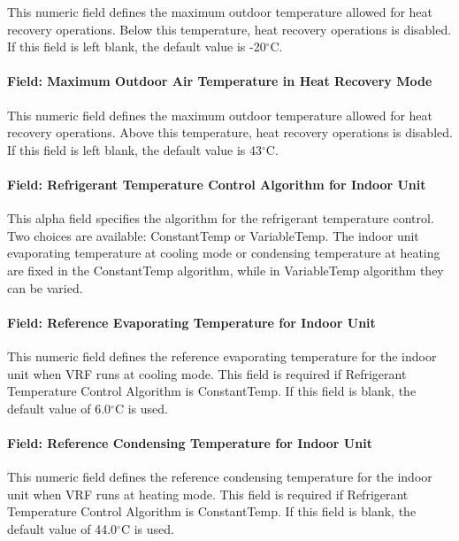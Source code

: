 This numeric field defines the maximum outdoor temperature allowed for heat recovery operations. Below this temperature, heat recovery operations is disabled. If this field is left blank, the default value is -20$^\circ$C.

\paragraph{Field: Maximum Outdoor Air Temperature in Heat Recovery Mode}

This numeric field defines the maximum outdoor temperature allowed for heat recovery operations. Above this temperature, heat recovery operations is disabled. If this field is left blank, the default value is 43$^\circ$C.

\paragraph{Field: Refrigerant Temperature Control Algorithm for Indoor Unit}

This alpha field specifies the algorithm for the refrigerant temperature control. Two choices are available: ConstantTemp or VariableTemp. The indoor unit evaporating temperature at cooling mode or condensing temperature at heating are fixed in the ConstantTemp algorithm, while in VariableTemp algorithm they can be varied.

\paragraph{Field: Reference Evaporating Temperature for Indoor Unit}

This numeric field defines the reference evaporating temperature for the indoor unit when VRF runs at cooling mode. This field is required if Refrigerant Temperature Control Algorithm is ConstantTemp. If this field is blank, the default value of 6.0$^\circ$C is used.

\paragraph{Field: Reference Condensing Temperature for Indoor Unit}

This numeric field defines the reference condensing temperature for the indoor unit when VRF runs at heating mode. This field is required if Refrigerant Temperature Control Algorithm is ConstantTemp. If this field is blank, the default value of 44.0$^\circ$C is used.

